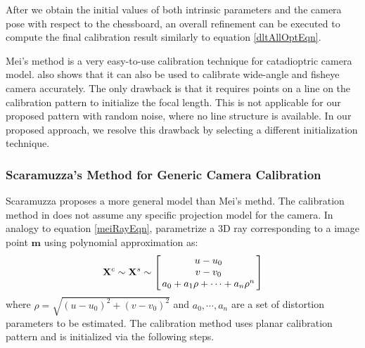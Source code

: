\documentclass{report}
\begin{document}
After we obtain the initial values of both intrinsic parameters and the camera pose with respect to the chessboard, an overall refinement can be executed to compute the final calibration result similarly to equation \ref{dltAllOptEqn}. 

Mei's method is a very easy-to-use calibration technique for catadioptric camera model. \cite{mei2007single} also shows that it can also be used to calibrate wide-angle and fisheye camera accurately. The only drawback is that it requires points on a line on the calibration pattern to initialize the focal length. This is not applicable for our proposed pattern with random noise, where no line structure is available. In our proposed approach, we resolve this drawback by selecting a different initialization technique. 

\subsubsection{Scaramuzza's Method for Generic Camera Calibration}
Scaramuzza \cite{scaramuzza2006toolbox} proposes a more general model than Mei's methd. The calibration method in \cite{scaramuzza2006toolbox} does not assume any specific projection model for the camera. In analogy to equation \ref{meiRayEqn}, \cite{scaramuzza2006toolbox} parametrize a 3D ray corresponding to a image point $\mathbf{m}$ using polynomial approximation as: 
\begin{equation}
\mathbf{X}^c \sim \mathbf{X}^s \sim
\arraycolsep=1.5pt%
\begin{bmatrix}
	\begin{array}{c}
	u - u_0 \\ v - v_0 \\ a_0 + a_1 \rho + \cdots + a_n \rho^n
	\end{array}
\end{bmatrix} 
\label{scaraRayEqn}
\end{equation}
where $\rho = \sqrt{(u - u_0)^2 + (v - v_0)^2}$ and $a_0, \cdots, a_n$ are a set of distortion parameters to be estimated. The calibration method uses planar calibration pattern and is initialized via the following steps. 
\end{document}
